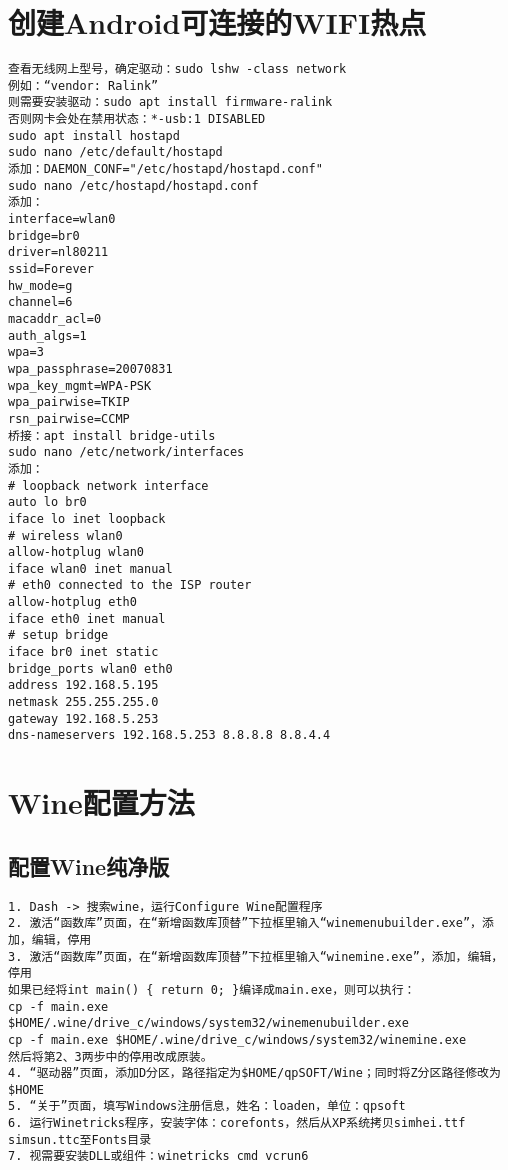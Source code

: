 \documentclass[a4paper,fontset=fandol,zihao=-4,linespread=1.2]{ctexbook}
\begin{document}
\section{创建Android可连接的WIFI热点}
\begin{lstlisting}
查看无线网上型号，确定驱动：sudo lshw -class network
例如：“vendor: Ralink”
则需要安装驱动：sudo apt install firmware-ralink
否则网卡会处在禁用状态：*-usb:1 DISABLED
sudo apt install hostapd
sudo nano /etc/default/hostapd
添加：DAEMON_CONF="/etc/hostapd/hostapd.conf"
sudo nano /etc/hostapd/hostapd.conf
添加：
interface=wlan0
bridge=br0
driver=nl80211
ssid=Forever
hw_mode=g
channel=6
macaddr_acl=0
auth_algs=1
wpa=3
wpa_passphrase=20070831
wpa_key_mgmt=WPA-PSK
wpa_pairwise=TKIP
rsn_pairwise=CCMP
桥接：apt install bridge-utils
sudo nano /etc/network/interfaces
添加：
# loopback network interface
auto lo br0
iface lo inet loopback
# wireless wlan0
allow-hotplug wlan0
iface wlan0 inet manual
# eth0 connected to the ISP router
allow-hotplug eth0
iface eth0 inet manual
# setup bridge
iface br0 inet static
bridge_ports wlan0 eth0
address 192.168.5.195
netmask 255.255.255.0
gateway 192.168.5.253
dns-nameservers 192.168.5.253 8.8.8.8 8.8.4.4
\end{lstlisting}

\section{Wine配置方法}

\subsection{配置Wine纯净版}
\begin{lstlisting}
1. Dash -> 搜索wine，运行Configure Wine配置程序
2. 激活“函数库”页面，在“新增函数库顶替”下拉框里输入“winemenubuilder.exe”，添加，编辑，停用
3. 激活“函数库”页面，在“新增函数库顶替”下拉框里输入“winemine.exe”，添加，编辑，停用
如果已经将int main() { return 0; }编译成main.exe，则可以执行：
cp -f main.exe $HOME/.wine/drive_c/windows/system32/winemenubuilder.exe
cp -f main.exe $HOME/.wine/drive_c/windows/system32/winemine.exe
然后将第2、3两步中的停用改成原装。
4. “驱动器”页面，添加D分区，路径指定为$HOME/qpSOFT/Wine；同时将Z分区路径修改为$HOME
5. “关于”页面，填写Windows注册信息，姓名：loaden，单位：qpsoft
6. 运行Winetricks程序，安装字体：corefonts，然后从XP系统拷贝simhei.ttf simsun.ttc至Fonts目录
7. 视需要安装DLL或组件：winetricks cmd vcrun6
\end{lstlisting}
\end{document}
